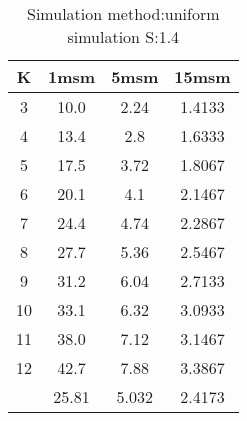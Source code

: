 \begin{table}[H]
\centering
\begin{tabular}{c|ccc}
K &1msm &5msm &15msm\\
\hline
3 & 10.0 & 2.24 & 1.4133\\
4 & 13.4 & 2.8 & 1.6333\\
5 & 17.5 & 3.72 & 1.8067\\
6 & 20.1 & 4.1 & 2.1467\\
7 & 24.4 & 4.74 & 2.2867\\
8 & 27.7 & 5.36 & 2.5467\\
9 & 31.2 & 6.04 & 2.7133\\
10 & 33.1 & 6.32 & 3.0933\\
11 & 38.0 & 7.12 & 3.1467\\
12 & 42.7 & 7.88 & 3.3867\\
\hline
& 25.81 & 5.032 & 2.4173\\
\end{tabular}
\caption{Simulation method:uniform simulation S:1.4}
\label{tab:s1.4}
\end{table}

